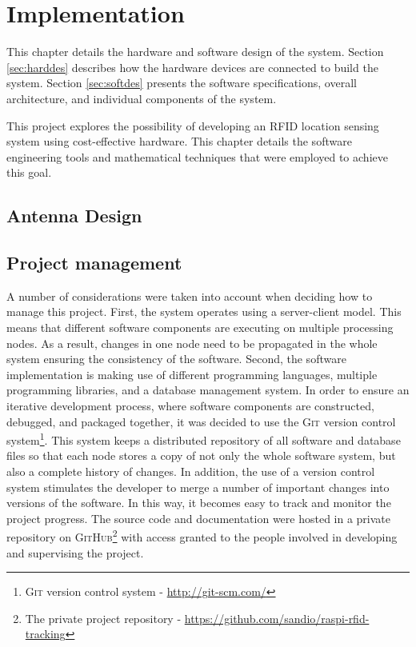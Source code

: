 \chapter{Implementation}
\label{ch:implementation}

This chapter details the hardware and software design of the system. Section \ref{sec:harddes} describes how the hardware devices are connected to build the system. Section \ref{sec:softdes} presents the software specifications, overall architecture, and individual components of the system.

This project explores the possibility of developing an RFID location sensing system using cost-effective hardware. This chapter details the software engineering tools and mathematical techniques that were employed to achieve this goal.



\section{Antenna Design}
\label{sec:antdes}

\section{Project management}

A number of considerations were taken into account when deciding how to manage this project. First, the system operates using a server-client model. This means that different software components are executing on multiple processing nodes. As a result, changes in one node need to be propagated in the whole system ensuring the consistency of the software.  Second, the software implementation is making use of different programming languages, multiple programming libraries, and a database management system. In order to ensure an iterative development process, where software components are constructed, debugged, and packaged together, it was decided to use the \textsc{Git} version control system\footnote{\textsc{Git} version control system - \url{http://git-scm.com/}}. This system keeps a distributed repository of all software and database files so that each node stores a copy of not only the whole software system, but also a complete history of changes. In addition, the use of a version control system stimulates the developer to merge a number of important changes into versions of the software. In this way, it becomes easy to track and monitor the project progress. The source code and documentation were hosted in a private repository on \textsc{GitHub}\footnote{The private project repository - \url{https://github.com/sandio/raspi-rfid-tracking}} with access granted to the people involved in developing and supervising the project.


